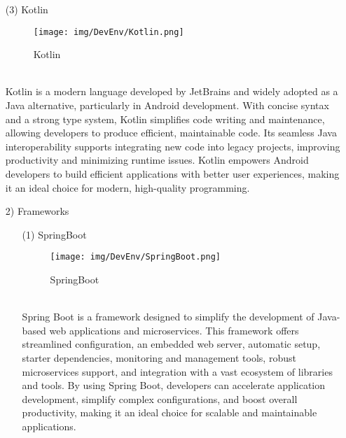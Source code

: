 \documentclass[conference]{IEEEtran}
\begin{document}
\begin{enumerate}
\begin{itemize}
\begin{itemize}
\item [(3)] Kotlin\cite{Kotlin}
\begin{figure}[h]
\hspace{1cm}
\centering
\begin{minipage}{0.5\columnwidth}
    \texttt{[image: img/DevEnv/Kotlin.png]}
    \caption{Kotlin}
\end{minipage}
\end{figure}\\
Kotlin is a modern language developed by JetBrains and widely adopted as a Java alternative, particularly in Android development. With concise syntax and a strong type system, Kotlin simplifies code writing and maintenance, allowing developers to produce efficient, maintainable code. Its seamless Java interoperability supports integrating new code into legacy projects, improving productivity and minimizing runtime issues. Kotlin empowers Android developers to build efficient applications with better user experiences, making it an ideal choice for modern, high-quality programming.\\
\end{itemize}

\begin{itemize}
\item [2)] Frameworks
\begin{itemize}
\item [(1)] SpringBoot\cite{SpringBoot}
\begin{figure}[h]
\hspace{2cm}
\centering
\begin{minipage}{0.5\columnwidth}
    \texttt{[image: img/DevEnv/SpringBoot.png]}
    \caption{SpringBoot}
\end{minipage}
\end{figure}\\
Spring Boot is a framework designed to simplify the development of Java-based web applications and microservices. This framework offers streamlined configuration, an embedded web server, automatic setup, starter dependencies, monitoring and management tools, robust microservices support, and integration with a vast ecosystem of libraries and tools. By using Spring Boot, developers can accelerate application development, simplify complex configurations, and boost overall productivity, making it an ideal choice for scalable and maintainable applications.\\


\end{itemize}
\end{itemize}
\end{itemize}
\end{enumerate}
\end{document}
